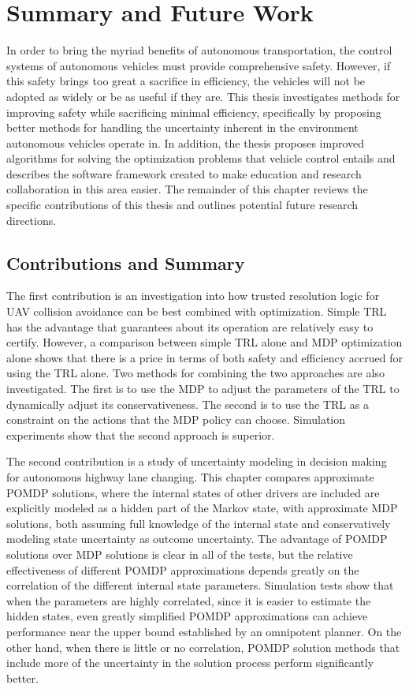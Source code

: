 \chapter{Summary and Future Work}

In order to bring the myriad benefits of autonomous transportation, the control systems of autonomous vehicles must provide comprehensive safety.
However, if this safety brings too great a sacrifice in efficiency, the vehicles will not be adopted as widely or be as useful if they are.
This thesis investigates methods for improving safety while sacrificing minimal efficiency, specifically by proposing better methods for handling the uncertainty inherent in the environment autonomous vehicles operate in.
In addition, the thesis proposes improved algorithms for solving the optimization problems that vehicle control entails and describes the software framework created to make education and research collaboration in this area easier.
The remainder of this chapter reviews the specific contributions of this thesis and outlines potential future research directions.

\section{Contributions and Summary}

The first contribution is an investigation into how trusted resolution logic for UAV collision avoidance can be best combined with optimization.
Simple TRL has the advantage that guarantees about its operation are relatively easy to certify.
However, a comparison between simple TRL alone and MDP optimization alone shows that there is a price in terms of both safety and efficiency accrued for using the TRL alone.
Two methods for combining the two approaches are also investigated.
The first is to use the MDP to adjust the parameters of the TRL to dynamically adjust its conservativeness.
The second is to use the TRL as a constraint on the actions that the MDP policy can choose.
Simulation experiments show that the second approach is superior.

The second contribution is a study of uncertainty modeling in decision making for autonomous highway lane changing.
This chapter compares approximate POMDP solutions, where the internal states of other drivers are included are explicitly modeled as a hidden part of the Markov state, with approximate MDP solutions, both assuming full knowledge of the internal state and conservatively modeling state uncertainty as outcome uncertainty.
The advantage of POMDP solutions over MDP solutions is clear in all of the tests, but the relative effectiveness of different POMDP approximations depends greatly on the correlation of the different internal state parameters.
Simulation tests show that when the parameters are highly correlated, since it is easier to estimate the hidden states, even greatly simplified POMDP approximations can achieve performance near the upper bound established by an omnipotent planner.
On the other hand, when there is little or no correlation, POMDP solution methods that include more of the uncertainty in the solution process perform significantly better.

